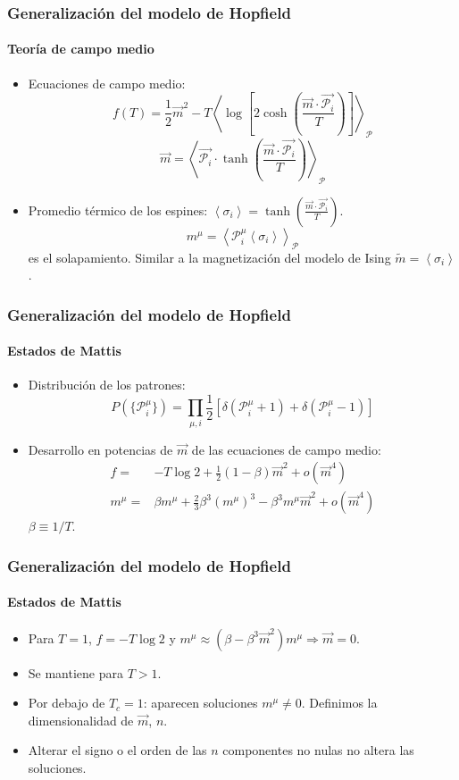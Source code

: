 \documentclass[11pt]{beamer}
\begin{document}
\begin{frame}
\frametitle{Generalización del modelo de Hopfield}
\framesubtitle{Teoría de campo medio}
\begin{itemize}
	\item Ecuaciones de campo medio:
	\begin{displaymath}
	f(T)=\frac{1}{2}\vec{m}^2 - T\left<\log\left[2\cosh\left(\frac{\vec{m}\cdot\vec{\mathcal{P}_i}}{T}\right)\right]\right>_{\mathcal{P}}
	\end{displaymath}
	\begin{displaymath}
	\vec{m}=\left<\vec{\mathcal{P}_i}\cdot\tanh\left(\frac{\vec{m}\cdot\vec{\mathcal{P}_i}}{T}\right)\right>_{\mathcal{P}}
	\end{displaymath}
	\item Promedio térmico de los espines: $\left<\sigma_i\right>=\tanh\left(\frac{\vec{m}\cdot\vec{\mathcal{P}_i}}{T}\right)$.
	\begin{displaymath}
	m^\mu=\left<\mathcal{P}^\mu_i{\left<\sigma_i\right>}\right>_{\mathcal{P}}
	\end{displaymath}
	es el solapamiento. Similar a la magnetización del modelo de Ising $\tilde{m}=\left<\sigma_i\right>$.
\end{itemize}
\end{frame}

\begin{frame}
\frametitle{Generalización del modelo de Hopfield}
\framesubtitle{Estados de Mattis}
\begin{itemize}
	\item Distribución de los patrones:
	\begin{displaymath}
	P(\lbrace\mathcal{P}^\mu_i\rbrace)=\prod_{\mu,i}\frac{1}{2}\left[\delta(\mathcal{P}^\mu_i + 1) + \delta(\mathcal{P}^\mu_i - 1)\right]
	\end{displaymath}
	\item Desarrollo en potencias de $\vec{m}$ de las ecuaciones de campo medio:
	\begin{align*}
	f=&-T\log 2 + \frac{1}{2}(1 - \beta)\vec{m}^2 + o(\vec{m}^4) \label{fseries}\\ m^\mu=&\beta m^\mu + \frac{2}{3}\beta^3 (m^\mu)^3 - \beta^3m^\mu\vec{m}^2 + o(\vec{m}^4)
	\end{align*}
	$\beta\equiv1/T$.
\end{itemize}
\end{frame}

\begin{frame}
\frametitle{Generalización del modelo de Hopfield}
\framesubtitle{Estados de Mattis}
\begin{itemize}
	\item Para $T=1$, $f=-T\log2$ y $m^\mu\approx(\beta-\beta^3\vec{m}^2)m^\mu\Rightarrow\vec{m}=0$.
	\item Se mantiene para $T>1$. 
	\item Por debajo de $T_c=1$: aparecen soluciones $m^\mu\neq0$. Definimos la dimensionalidad de $\vec{m}$, $n$.
	\item Alterar el signo o el orden de las $n$ componentes no nulas no altera las soluciones.
\end{itemize}
\end{frame}
\end{document}
